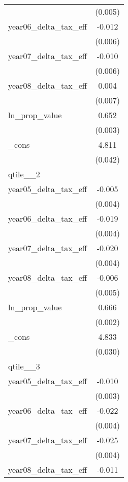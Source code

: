 {\begin{tabular}{l*{1}{c}}
            &     (0.005)         \\
[1em]
year06\_delta\_tax\_eff&      -0.012\sym{**} \\
            &     (0.006)         \\
[1em]
year07\_delta\_tax\_eff&      -0.010\sym{*}  \\
            &     (0.006)         \\
[1em]
year08\_delta\_tax\_eff&       0.004         \\
            &     (0.007)         \\
[1em]
ln\_prop\_value&       0.652\sym{***}\\
            &     (0.003)         \\
[1em]
\_cons      &       4.811\sym{***}\\
            &     (0.042)         \\
\hline
qtile\_\_2    &                     \\
year05\_delta\_tax\_eff&      -0.005         \\
            &     (0.004)         \\
[1em]
year06\_delta\_tax\_eff&      -0.019\sym{***}\\
            &     (0.004)         \\
[1em]
year07\_delta\_tax\_eff&      -0.020\sym{***}\\
            &     (0.004)         \\
[1em]
year08\_delta\_tax\_eff&      -0.006         \\
            &     (0.005)         \\
[1em]
ln\_prop\_value&       0.666\sym{***}\\
            &     (0.002)         \\
[1em]
\_cons      &       4.833\sym{***}\\
            &     (0.030)         \\
\hline
qtile\_\_3    &                     \\
year05\_delta\_tax\_eff&      -0.010\sym{***}\\
            &     (0.003)         \\
[1em]
year06\_delta\_tax\_eff&      -0.022\sym{***}\\
            &     (0.004)         \\
[1em]
year07\_delta\_tax\_eff&      -0.025\sym{***}\\
            &     (0.004)         \\
[1em]
year08\_delta\_tax\_eff&      -0.011\sym{**} \\

\end{tabular}}
